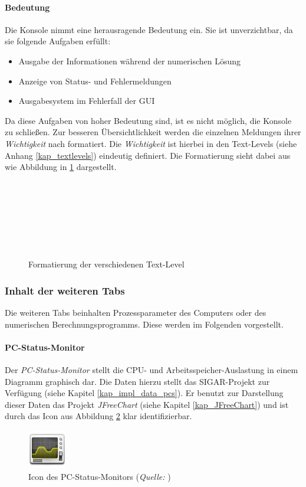 \documentclass[a4paper,12pt,oneside,openright,onecolumn,final,titlepage,fleqn,ngerman]{scrreprt}
\newcommand{\imgCaption}[2]{\caption[#1]{#1 (\textit{Quelle:} #2)}}			%
\begin{document}
	\paragraph{Bedeutung}
	Die Konsole nimmt eine herausragende Bedeutung ein. Sie ist unverzichtbar, da sie folgende Aufgaben erfüllt:
	\begin{itemize}
		\item Ausgabe der Informationen während der numerischen Lösung
		\item Anzeige von Status- und Fehlermeldungen
		\item Ausgabesystem im Fehlerfall der GUI
	\end{itemize}
	
	Da diese Aufgaben von hoher Bedeutung sind, ist es nicht möglich, die Konsole zu schließen. Zur besseren Übersichtlichkeit werden die einzelnen Meldungen ihrer \emph{Wichtigkeit} nach formatiert. Die \emph{Wichtigkeit} ist hierbei in den Text-Levels (siehe Anhang \ref{kap_textlevels}) eindeutig definiert. Die Formatierung sieht dabei aus wie Abbildung in \ref{fig_format} dargestellt.
	\begin{figure}[ht]
		\centering
		\ttfamily
		\textbf{\color{red}{Fatal}}\\
		\color{red}{Error}\\
		\textbf{\color{orange}{Warning}}\\
		\textbf{\color{blue}{Information important}}\\
		\color{blue}{Information casual}\\
		\color{gray}{Debug}\\
		\color{black}{Unknown}
		\caption{Formatierung der verschiedenen Text-Level}
		\label{fig_format}
	\end{figure}
	

	\subsubsection{Inhalt der weiteren Tabs}
	Die weiteren Tabs beinhalten Prozessparameter des Computers oder des numerischen Berechnungsprogramms. Diese werden im Folgenden vorgestellt.
	
	\paragraph{PC-Status-Monitor}\label{kap_PCStatusMonitor}
	Der \emph{PC-Status-Monitor} stellt die CPU- und Ar\-beits\-spei\-cher-Auslastung in einem Diagramm graphisch dar. Die Daten hierzu stellt das SIGAR-Projekt zur Verfügung (siehe Kapitel \ref{kap_impl_data_pcs}). Er benutzt zur Darstellung dieser Daten das Projekt \emph{JFreeChart} (siehe Kapitel \ref{kap_JFreeChart}) und ist durch das Icon aus Abbildung \ref{icon_statusmonitor} klar identifizierbar.
	\begin{figure}[ht]
		\centering
		\includegraphics[width=64px]{res/sysmonitor.png}
		\imgCaption{Icon des PC-Status-Monitors}{}
		\label{icon_statusmonitor}
	\end{figure}
	
\end{document}
